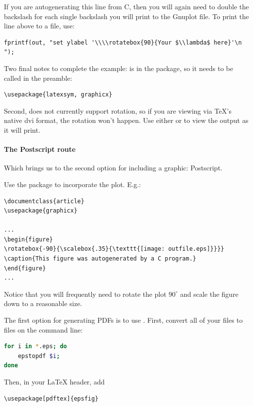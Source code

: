 If you are autogenerating this line from C, then you will again need to
double the backslash for each single backslash you will print to the
Gnuplot file. To print the line above to a file, use:
\begin{lstlisting}
fprintf(out, "set ylabel '\\\\rotatebox{90}{Your $\\lambda$ here}'\n ");
\end{lstlisting}

Two final notes to complete the example: 
is in the  package, so it needs to be called in the preamble: 
\begin{lstlisting}
\usepackage{latexsym, graphicx}
\end{lstlisting}
Second,  does not currently support rotation, so if you are
viewing via \TeX's native dvi format, the rotation won't happen. Use
either  or  to view the output as it
will print.

\paragraph{The Postscript route}
Which brings us to the second option for including a graphic:
Postscript.

Use the  package to incorporate the plot. E.g.:
\begin{lstlisting}[language={}]
\documentclass{article}
\usepackage{graphicx}

...
\begin{figure}
\rotatebox{-90}{\scalebox{.35}{\texttt{[image: outfile.eps]}}}}
\caption{This figure was autogenerated by a C program.}
\end{figure}
...

\end{lstlisting}
Notice that you will frequently need to rotate the plot $90^\circ$
and scale the figure down to a reasonable size.

The first option for generating PDFs is to use . First,
convert all of your  files to  files on the command
line:
\begin{lstlisting}[language=bash]
for i in *.eps; do 
    epstopdf $i;
done
\end{lstlisting}

Then, in your \LaTeX{} header, add 
\begin{lstlisting}[language=sql]
\usepackage[pdftex]{epsfig}
\end{lstlisting}

